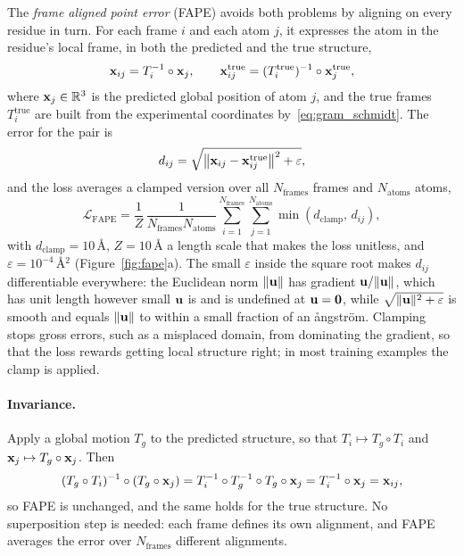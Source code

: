 The \emph{frame aligned point error} (FAPE) avoids both problems by aligning on every residue in turn. For each frame $i$ and each atom $j$, it expresses the atom in the residue's local frame, in both the predicted and the true structure,
\begin{equation}
  \mathbf{x}_{ij} = T_i^{-1}\circ\mathbf{x}_j, \qquad \mathbf{x}^{\text{true}}_{ij} = (T_i^{\text{true}})^{-1}\circ\mathbf{x}^{\text{true}}_j ,
\end{equation}
where $\mathbf{x}_j\in\mathbb{R}^3$ is the predicted global position of atom $j$, and the true frames $T^{\text{true}}_i$ are built from the experimental coordinates by~\eqref{eq:gram_schmidt}. The error for the pair is
\begin{equation}
  d_{ij} = \sqrt{\big\|\mathbf{x}_{ij} - \mathbf{x}^{\text{true}}_{ij}\big\|^2 + \varepsilon},
\end{equation}
and the loss averages a clamped version over all $N_{\text{frames}}$ frames and $N_{\text{atoms}}$ atoms,
\begin{equation}
  \mathcal{L}_{\text{FAPE}} = \frac{1}{Z}\,\frac{1}{N_{\text{frames}}N_{\text{atoms}}}\sum_{i=1}^{N_{\text{frames}}}\sum_{j=1}^{N_{\text{atoms}}}\min\left(d_{\text{clamp}},\,d_{ij}\right),
  \label{eq:fape}
\end{equation}
with $d_{\text{clamp}}=10$\,\AA, $Z=10$\,\AA{} a length scale that makes the loss unitless, and $\varepsilon=10^{-4}$\,\AA$^2$ (Figure~\ref{fig:fape}a). The small $\varepsilon$ inside the square root makes $d_{ij}$ differentiable everywhere: the Euclidean norm $\|\mathbf{u}\|$ has gradient $\mathbf{u}/\|\mathbf{u}\|$, which has unit length however small $\mathbf{u}$ is and is undefined at $\mathbf{u}=\mathbf{0}$, while $\sqrt{\|\mathbf{u}\|^2+\varepsilon}$ is smooth and equals $\|\mathbf{u}\|$ to within a small fraction of an \aa{}ngstr\"om. Clamping stops gross errors, such as a misplaced domain, from dominating the gradient, so that the loss rewards getting local structure right; in most training examples the clamp is applied.

\paragraph{Invariance.} Apply a global motion $T_g$ to the predicted structure, so that $T_i\mapsto T_g\circ T_i$ and $\mathbf{x}_j\mapsto T_g\circ\mathbf{x}_j$. Then
\begin{equation}
  (T_g\circ T_i)^{-1}\circ(T_g\circ\mathbf{x}_j) = T_i^{-1}\circ T_g^{-1}\circ T_g\circ\mathbf{x}_j = T_i^{-1}\circ\mathbf{x}_j = \mathbf{x}_{ij},
\end{equation}
so FAPE is unchanged, and the same holds for the true structure. No superposition step is needed: each frame defines its own alignment, and FAPE averages the error over $N_{\text{frames}}$ different alignments.

